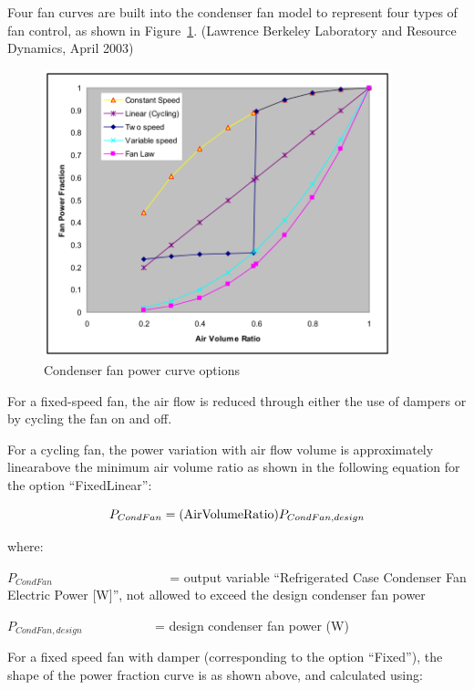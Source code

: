 Four fan curves are built into the condenser fan model to represent four types of fan control, as shown in Figure~\ref{fig:condenser-fan-power-curve-options}. (Lawrence Berkeley Laboratory and Resource Dynamics, April 2003)

\begin{figure}[hbtp] %
\centering
\includegraphics[width=0.9\textwidth, height=0.9\textheight, keepaspectratio=true]{media/image6291.svg.png}
\caption{Condenser fan power curve options \protect \label{fig:condenser-fan-power-curve-options}}
\end{figure}

For a fixed-speed fan, the air flow is reduced through either the use of dampers or by cycling the fan on and off.

For a cycling fan, the power variation with air flow volume is approximately linearabove the minimum air volume ratio as shown in the following equation for the option ``FixedLinear'':

\begin{equation}
{P_{CondFan}} = ({\rm{Air Volume Ratio}}){P_{CondFan,design}}
\end{equation}

where:

\({P_{CondFan}}\) ~~~~~~~~~~~~~~~~~ = output variable ``Refrigerated Case Condenser Fan Electric Power {[}W{]}'', not allowed to exceed the design condenser fan power

\({P_{CondFan,design}}\) ~~~~~~~~~~ = design condenser fan power (W)

For a fixed speed fan with damper (corresponding to the option ``Fixed''), the shape of the power fraction curve is as shown above, and calculated using:

